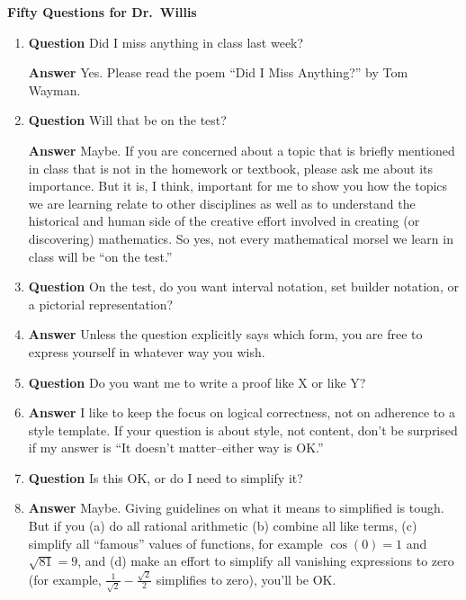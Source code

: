 \documentclass[12pt]{article}
\newcounter{ex}\setcounter{ex}{0}
\begin{document}
\begin{flushleft}
  \large
\textbf{Fifty Questions for Dr.\ Willis}
\end{flushleft}  
\normalsize
\begin{enumerate}

\item \textbf{Question} Did I miss anything in class last week?

\textbf{Answer} Yes.  Please read  the poem “Did I Miss Anything?” by Tom Wayman.  

\item \textbf{Question} Will that be on the test?

\textbf{Answer} Maybe. If you are concerned about a topic that is briefly
mentioned in class that is not in the homework or textbook, please ask me
about its importance. But it is, I think, important for me to 
show you how the topics we are learning relate to other disciplines  
as well as to understand the historical and human side of the
creative effort involved in creating (or discovering) mathematics. So yes,
not every mathematical morsel we learn in class will be ``on the test.''

\item \textbf{Question} On the test, do you want interval notation, set builder
notation, or a pictorial representation?

\item  \textbf{Answer} Unless the question explicitly says which form,
you are free to express yourself in whatever way you wish.

\item \textbf{Question} Do you want me to write a proof like X or 
like Y?

\item  \textbf{Answer} I like to keep the focus on logical 
correctness, not on adherence to a style template. If your question is about
style, not content, don't be surprised if my answer is ``It doesn't 
matter--either way is OK.'' 

\item \textbf{Question} Is this OK, or do I need to simplify it?

\item  \textbf{Answer} Maybe. Giving guidelines on what it means to 
  simplified is tough. But if you  (a) do all rational arithmetic (b) combine
  all like terms, (c) simplify all ``famous'' values of functions, 
  for example $\cos(0)=1$ and $\sqrt{81} = 9$, and (d) make an effort
  to simplify all vanishing expressions to zero (for example, 
  $\frac{1}{\sqrt{2}} - \frac{\sqrt{2}}{2}$ simplifies to zero), you'll be OK.


\end{enumerate}
\end{document}
